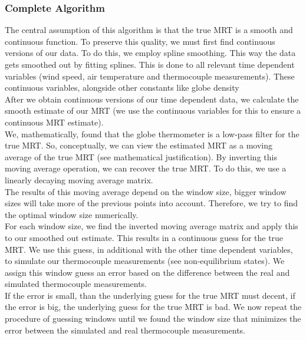 \documentclass[]{scrartcl}
\begin{document}
\subsubsection{Complete Algorithm}
The central assumption of this algorithm is that the true MRT is a smooth and continuous function. To preserve this quality, we must first find continuous versions of our data. To do this, we employ spline smoothing. This way the data gets smoothed out by fitting splines. This is done to all relevant time dependent variables (wind speed, air temperature and thermocouple measurements). These continuous variables, alongside other constants like globe density
\\

After we obtain continuous versions of our time dependent data, we calculate the smooth estimate of our MRT (we use the continuous variables for this to ensure a continuous MRT estimate).
\\

We, mathematically, found that the globe thermometer is a low-pass filter for the true MRT. So, conceptually, we can view the estimated MRT as a moving average of the true MRT (see mathematical justification). By inverting this moving average operation, we can recover the true MRT. To do this, we use a linearly decaying moving average matrix.
\\

The results of this moving average depend on the window size, bigger window sizes will take more of the previous points into account. Therefore, we try to find the optimal window size numerically.
\\

For each window size, we find the inverted moving average matrix and apply this to our smoothed out estimate. This results in a continuous guess for the true MRT. We use this guess, in additional with the other time dependent variables, to simulate our thermocouple measurements (see non-equilibrium states). We assign this window guess an error based on the difference between the real and simulated thermocouple measurements.
\\

If the error is small, than the underlying guess for the true MRT must decent, if the error is big, the underlying guess for the true MRT is bad. We now repeat the procedure of guessing windows until we found the window size that minimizes the error between the simulated and real thermocouple measurements.
\\
\end{document}
